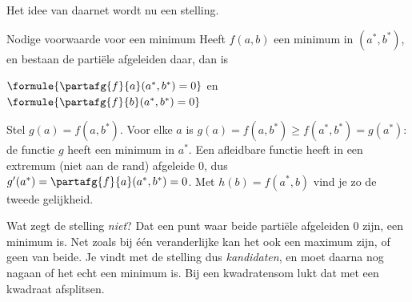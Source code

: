 
\begin{oefeningen}
\end{oefeningen}

Het idee van daarnet wordt nu een stelling.

\begin{theorie}
\begin{stelling}{Nodige voorwaarde voor een minimum}
Heeft $f(a, b)$ een minimum in $(a^*, b^*)$, en bestaan de partiële afgeleiden daar, dan is

\vspace{1mm}
\qquad $\formule{\partafg{f}{a}(a^*, b^*) = 0}$ \quad en \quad $\formule{\partafg{f}{b}(a^*, b^*) = 0}$
\end{stelling}

\begin{bewijs}
Stel $g(a) = f(a, b^*)$. Voor elke $a$ is $g(a) = f(a, b^*) \geqslant f(a^*, b^*) = g(a^*)$: de functie $g$ heeft een minimum in $a^*$. Een afleidbare functie heeft in een extremum (niet aan de rand) afgeleide 0, dus $g'(a^*) = \partafg{f}{a}(a^*, b^*) = 0$. Met $h(b) = f(a^*, b)$ vind je zo de tweede gelijkheid.
\end{bewijs}
\end{theorie}

Wat zegt de stelling \textit{niet}? Dat een punt waar beide partiële afgeleiden 0 zijn, een minimum is. Net zoals bij één veranderlijke kan het ook een maximum zijn, of geen van beide. Je vindt met de stelling dus \textit{kandidaten}, en moet daarna nog nagaan of het echt een minimum is. Bij een kwadratensom lukt dat met een kwadraat afsplitsen.

